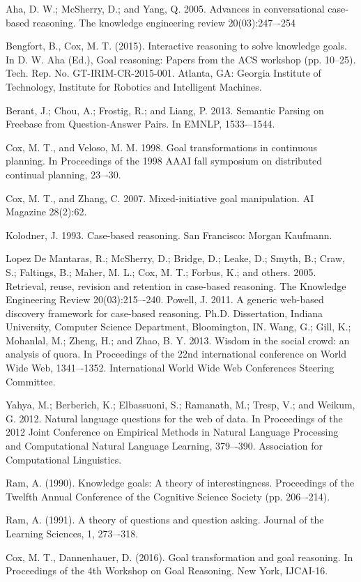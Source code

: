 \documentclass{llncs}
\begin{document}
%
%
\begin{thebibliography}{5}
%
Aha, D. W.; McSherry, D.; and Yang, Q. 2005. Advances
in conversational case-based reasoning. The knowledge engineering review 20(03):247–-254

Bengfort, B., Cox, M. T. (2015). Interactive reasoning to solve knowledge goals. In D. W. Aha (Ed.), Goal reasoning: Papers from the ACS workshop (pp. 10--25). Tech. Rep. No. GT-IRIM-CR-2015-001. Atlanta, GA: Georgia Institute of Technology, Institute for Robotics and Intelligent Machines.

Berant, J.; Chou, A.; Frostig, R.; and Liang, P. 2013. Semantic Parsing on Freebase from Question-Answer Pairs. In
EMNLP, 1533-–1544.

Cox, M. T., and Veloso, M. M. 1998. Goal transformations
in continuous planning. In Proceedings of the 1998 AAAI
fall symposium on distributed continual planning, 23–-30.

Cox, M. T., and Zhang, C. 2007. Mixed-initiative goal manipulation. AI Magazine 28(2):62.

Kolodner, J. 1993. Case-based reasoning. San Francisco: Morgan Kaufmann.

Lopez De Mantaras, R.; McSherry, D.; Bridge, D.; Leake,
D.; Smyth, B.; Craw, S.; Faltings, B.; Maher, M. L.; Cox,
M. T.; Forbus, K.; and others. 2005. Retrieval, reuse, revision and retention in case-based reasoning. The Knowledge
Engineering Review 20(03):215–-240.
Powell, J. 2011. A generic web-based discovery framework for case-based reasoning. Ph.D. Dissertation, Indiana University, Computer Science Department, Bloomington, IN.
Wang, G.; Gill, K.; Mohanlal, M.; Zheng, H.; and Zhao,
B. Y. 2013. Wisdom in the social crowd: an analysis of
quora. In Proceedings of the 22nd international conference
on World Wide Web, 1341–-1352. International World Wide
Web Conferences Steering Committee.

Yahya, M.; Berberich, K.; Elbassuoni, S.; Ramanath, M.;
Tresp, V.; and Weikum, G. 2012. Natural language questions
for the web of data. In Proceedings of the 2012 Joint Conference on Empirical Methods in Natural Language Processing
and Computational Natural Language Learning, 379–-390.
Association for Computational Linguistics.

Ram, A. (1990). Knowledge goals: A theory of interestingness. Proceedings of the Twelfth Annual
Conference of the Cognitive Science Society (pp. 206–-214).

Ram, A. (1991). A theory of questions and question asking. Journal of the Learning Sciences, 1,
273–-318.

Cox, M. T., Dannenhauer, D. (2016). Goal transformation and goal reasoning. In Proceedings of the 4th Workshop on Goal Reasoning. New York, IJCAI-16.
\end{thebibliography}
\end{document}
